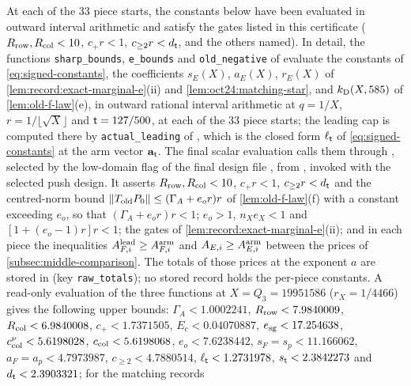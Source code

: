 \begin{certificate}
\label{cert:signed-local}
At each of the $33$ piece starts, the constants below have been
evaluated in outward interval arithmetic and satisfy the gates
listed in this certificate ($R_{\rm row},R_{\rm col}<10$,
$c_+r<1$, $c_{\ge2}r<d_\mathsf t$, and the others named). In detail,
the functions \texttt{sharp\_bounds}, \texttt{e\_bounds} and
\texttt{old\_negative} of
 evaluate the constants of
\eqref{eq:signed-constants}, the coefficients $s_E(X)$, $a_E(X)$, $r_E(X)$ of
\cref{lem:record:exact-marginal-e}(ii) and \cref{lem:oct24:matching-star}, and
$k_{\rm D}(X,585)$ of \cref{lem:old-f-law}(e), in outward rational interval
arithmetic at $q=1/X$, $r=1/\lfloor\sqrt X\rfloor$ and $\mathsf t=127/500$, at each of
the $33$ piece starts; the leading cap is computed there by
\texttt{actual\_leading} of
, which is the
closed form $\ell_\mathsf t$ of \eqref{eq:signed-constants} at the arm vector
$\mathbf a_\mathsf t$. The final scalar evaluation calls them through
, selected by the
low-domain flag of the final design file
, from
, invoked with the selected push design. It asserts
$R_{\rm row},R_{\rm col}<10$, $c_+r<1$, $c_{\ge2}r<d_\mathsf t$ and
the centred-norm bound $\|T_{\rm old}P_0\|\le(\Gamma_A+e_or)r$
of \cref{lem:old-f-law}(f) with a constant exceeding $e_o$, so
that
$(\Gamma_A+e_or)r<1$;
$e_o>1$, $n_Xe_X<1$ and $[1+(e_o-1)r]r<1$; the gates of
\cref{lem:record:exact-marginal-e}(ii); and in each piece the inequalities
$A^{\rm lead}_{F,i}\ge A^{\rm arm}_{F,i}$ and $A_{E,i}\ge A^{\rm arm}_{E,i}$ between
the prices of \cref{subsec:middle-comparison}. The totals of those prices at the
exponent $a$ are stored in 
(key \texttt{raw\_totals}); no stored record holds the per-piece constants. A
read-only evaluation of the three functions at $X=Q_3=19951586$
($r_X=1/4466$) gives the following upper bounds: $\Gamma_A<1.0002241$,
$R_{\rm row}<7.9840009$, $R_{\rm col}<6.9840008$, $c_+<1.7371505$,
$E_c<0.04070887$, $e_{\rm sg}<17.254638$, $c^\nu_{\rm col}<5.6198028$,
$c_{\rm col}<5.6198068$, $e_o<7.6238442$, $s_F=s_p<11.166062$,
$a_F=a_p<4.7973987$, $c_{\ge2}<4.7880514$, $\ell_\mathsf t<1.2731978$,
$s_\mathsf t<2.3842273$ and $d_\mathsf t<2.3903321$; for the matching records

\end{certificate}
